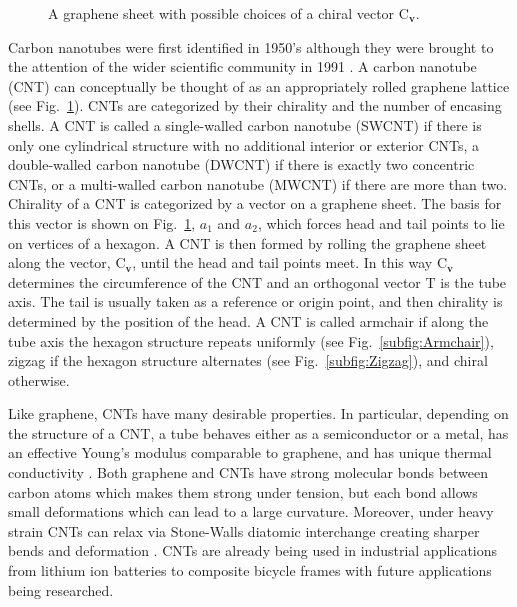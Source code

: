 	\begin{figure}
		\begin{center}
			\def\svgwidth{.75\columnwidth}
			
		\end{center}		
		\caption{A graphene sheet with possible choices of a chiral vector $\mbox{C}_{\textbf{v}}$.
		\label{fig:GrapheneCat}}
	\end{figure}	
	
	Carbon nanotubes were first identified in 1950's although they were brought to the attention of the wider scientific community in 1991 \cite{Iijima1991}. A carbon nanotube (CNT) can conceptually be thought of as an appropriately rolled graphene lattice (see Fig.~\ref{fig:GrapheneCat}). CNTs are categorized by their chirality and the number of encasing shells. A CNT is called a single-walled carbon nanotube (SWCNT) if there is only one cylindrical structure with no additional interior or exterior CNTs, a double-walled carbon nanotube (DWCNT) if there is exactly two concentric CNTs, or a multi-walled carbon nanotube (MWCNT) if there are more than two. Chirality of a CNT is categorized by a vector on a graphene sheet. The basis for this vector is shown on Fig.~\ref{fig:GrapheneCat}, $a_1$ and $a_2$, which forces head and tail points to lie on vertices of a hexagon. A CNT is then formed by rolling the graphene sheet along the vector, $\mbox{C}_{\textbf{v}}$, until the head and tail points meet. In this way $\mbox{C}_{\textbf{v}}$ determines the circumference of the CNT and an orthogonal vector T is the tube axis. The tail is usually taken as a reference or origin point, and then chirality is determined by the position of the head. A CNT is called armchair if along the tube axis the hexagon structure repeats uniformly (see Fig.~\ref{subfig:Armchair}), zigzag if the hexagon structure alternates (see Fig.~\ref{subfig:Zigzag}), and chiral otherwise.
	
	Like graphene, CNTs have many desirable properties. In particular, depending on the structure of a CNT, a tube behaves either as a semiconductor or a metal, has an effective Young's modulus comparable to graphene, and has unique thermal conductivity \cite{Dresselhaus2004}. Both graphene and CNTs have strong molecular bonds between carbon atoms which makes them strong under tension, but each bond allows small deformations which can lead to a large curvature. Moreover, under heavy strain CNTs can relax via Stone-Walls diatomic interchange creating sharper bends and deformation \cite{Yakobson1998}. CNTs are already being used in industrial applications from lithium ion batteries to composite bicycle frames \cite{De2013} with future applications being researched.
	
